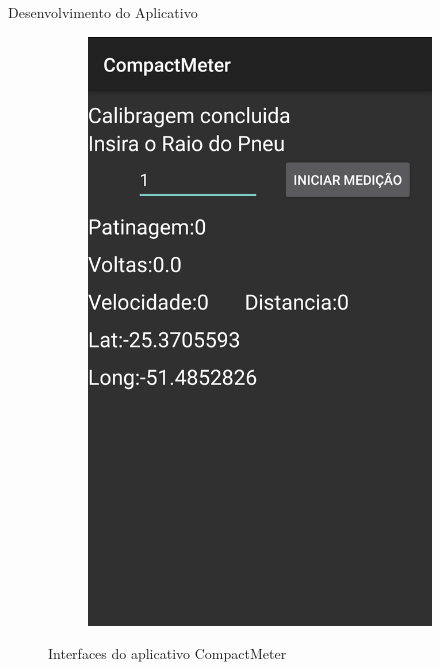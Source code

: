 \documentclass[12pt]{beamer}
\begin{document}
\begin{frame}{Desenvolvimento do Aplicativo}
\begin{figure}
\begin{subfigure}[t]{0.3\textwidth}
        \includegraphics[width=\textwidth]{medicao.png}
        \label{fig:medicao}
        \end{subfigure}
    \caption{Interfaces do aplicativo CompactMeter}
    \label{fig:interfaces}
    \end{figure}
\end{frame}
\end{document}
